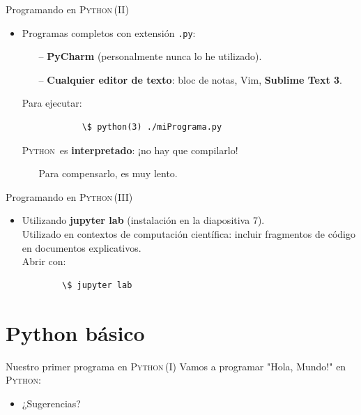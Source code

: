 \documentclass[10pt]{beamer} %
\newcommand{\py}{\textsc{Python}}
\begin{document}
\begin{frame}[fragile]{Programando en \py\,(II)}
    \begin{itemize}
        \item Programas completos con extensión \texttt{.py}:
            \begin{itemize}
                \item[--] \textbf{PyCharm} (personalmente nunca lo he utilizado).
                \item[--] \textbf{Cualquier editor de texto}: bloc de notas, Vim, \textbf{Sublime Text 3}.
            \end{itemize}
            Para ejecutar:
            \begin{verbatim}
            \$ python(3) ./miPrograma.py
            \end{verbatim}
            \py\, es \textbf{interpretado}: ¡no hay que compilarlo!
            \begin{itemize}
                \item[] Para compensarlo, es muy lento. 
            \end{itemize}
    \end{itemize}
\end{frame}

\begin{frame}[fragile]{Programando en \py\,(III)}
    \begin{itemize}
        \item Utilizando \textbf{jupyter lab} (instalación en la diapositiva 7).\\
        Utilizado en contextos de computación científica: incluir fragmentos de código en documentos explicativos.\\
        Abrir con:
        \begin{verbatim}
        \$ jupyter lab
        \end{verbatim}
    \end{itemize}
\end{frame}

\section{Python básico}

\begin{frame}{Nuestro primer programa en \py\,(I)}
    Vamos a programar "Hola, Mundo!" en \py:
    \begin{itemize}
        \item ¿Sugerencias?
    \end{itemize}
\end{frame}
\end{document}
